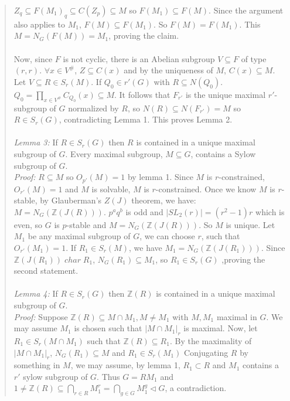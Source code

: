 \begin{quote}
$Z_q \subseteq F(M_1)_q \subseteq C(Z_p) \subseteq M$ so
$F(M_1) \subseteq F(M)$.  Since
the argument also applies to $M_1$, $F(M) \subseteq F(M_1)$. So
$F(M)= F(M_1)$.  This $M= N_G(F(M)) = M_1$, proving the claim.
\\
\\
Now, since $F$ is not cyclic, there is an Abelian subgroup
$V \subseteq F$ of type $(r,r)$.  $\forall x \in V^{\#}$, $Z \subseteq C(x)$
and by the uniqueness of $M$, $C(x) \subseteq M$.  Let $V \subseteq R \in S_r(M)$.
If $Q_0 \in r'(G)$  with $R \subseteq N(Q_0)$.  $Q_0 = \prod_{x \in V^{\#}} C_{Q_0}(x) \subseteq M$.
It follows that $F_{r'}$ is the unique maximal $r'$-subgroup of $G$ normalized by $R$, so
$N(R) \subseteq N(F_{r'}) = M$ so $R \in S_r(G)$, contradicting Lemma 1.  This proves Lemma 2.
\\
\\
\emph {Lemma 3:}  If $R \in S_r(G)$ then $R$ is contained in a unique maximal subgroup of
$G$.  Every maximal subgroup, $M \subseteq G$, contains a Sylow subgroup of $G$.
\\
\emph{Proof:} $R \subseteq M$ so $O_{p'}(M)=1$ by lemma 1.  Since $M$ is
$r$-constrained, $O_{r'}(M)=1$ and $M$ is solvable, $M$ is $r$-constrained.  Once
we know $M$ is $r$-stable, by Glauberman's $Z(J)$ theorem, we have: $M=N_G({\mathbb Z}(J(R)))$.
$p^aq^b$ is odd and $|SL_2(r)|= (r^2-1)r$ which is even, so $G$ is $p$-stable and $M=N_G({\mathbb Z}(J(R)))$.
So $M$ is unique.
Let $M_1$ be any maximal subgroup of $G$, we can choose $r$, such that $O_{r'}(M_1)=1$.
If $R_1 \in S_r(M)$, we have
$M_1 =N_G({\mathbb Z}(J(R_1)))$.
Since ${\mathbb Z}(J(R_1)) \; char \; R_1$,
$N_G(R_1) \subseteq M_1$, so $R_1 \in S_r(G)$ ,proving the second statement.
\\
\\
\emph {Lemma 4:}  If $R \in S_r(G)$ then ${\mathbb Z}(R)$ is contained in a 
unique maximal subgroup of $G$.
\\
\emph{Proof:}  Suppose ${\mathbb Z}(R) \subseteq M \cap M_1, M \ne M_1$ with $M, M_1$ maximal in $G$.
We may assume $M_1$ is chosen such that $|M \cap M_1|_r$ is maximal.  Now, let
$R_1 \in S_r(M \cap M_1)$ such that ${\mathbb Z}(R) \subseteq R_1$.  By the maximality of $|M \cap M_1|_r$,
$N_G(R_1) \subseteq M$ and $R_1 \in S_r(M_1)$
Conjugating $R$ by something in $M$, we may assume, by lemma 1,
$R_1 \subset R$ and $M_1$ contains a $r'$ sylow subgroup of $G$.
Thus $G=RM_1$ and
$1 \ne {\mathbb Z}(R) \subseteq \bigcap_{r \in R} M_1^r= \bigcap_{g \in G} M_1^g \lhd G$,
a contradiction.
\\

\end{quote}

